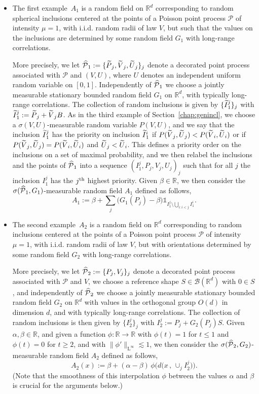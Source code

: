 \documentclass[AHL,Unicode,longabstracts]{cedram}
\newcommand{\R}{\mathbb R}
\newcommand{\B}{\mathcal B}
\newcommand{\Pc}{\mathcal P}
\DeclareMathOperator{\Ld}{L}
\let\oldtilde\tilde
\renewcommand*{\tilde}[1]{\mathchoice{\widetilde{#1}}{\widetilde{#1}}{\oldtilde{#1}}{\oldtilde{#1}}}\let\oldhat\hat
\renewcommand*{\hat}[1]{\mathchoice{\widehat{#1}}{\widehat{#1}}{\oldhat{#1}}{\oldhat{#1}}}\let\oldexists\exists
\renewcommand*{\exists}{\mathrel{\oldexists}}
\begin{document}
\begin{itemize}
\item The first example~$A_1$ is a random field on $\R^d$ corresponding to random spherical inclusions centered at the points of a Poisson point process $\Pc$ of intensity $\mu=1$, with i.i.d. random radii of law $V$, but such that the values on the inclusions are determined by some random field $G_1$ with long-range correlations.

More precisely, we let $\hat\Pc_1:=\{\tilde P_j,\tilde V_j,\tilde U_j\}_j$ denote a decorated point process associated with $\Pc$ and $(V,U)$, where $U$ denotes an independent uniform random variable on $[0,1]$. Independently of $\hat\Pc_1$ we choose a jointly measurable stationary bounded random field $G_1$ on $\R^d$, with typically long-range correlations. The collection of random inclusions is given by $\{\tilde I_1^j\}_j$ with $\tilde I_1^j:=\tilde P_j+\tilde V_jB$. As in the third example of Section~\ref{chap:genincl}, we choose a $\sigma(V,U)$-measurable random variable $P(V,U)$, and we say that the inclusion $\tilde I_1^j$ has the priority on inclusion $\tilde I_1^i$ if $P(\tilde V_j,\tilde U_j)<P(\tilde V_i,\tilde U_i)$ or if $P(\tilde V_j,\tilde U_j)=P(\tilde V_i,\tilde U_i)$ and $\tilde U_j<\tilde U_i$. This defines a priority order on the inclusions on a set of maximal probability, and we then relabel the inclusions and the points of $\hat\Pc_1$ into a sequence $(I_1^j, P_j,V_j,U_j)_j$ such that for all $j$ the inclusion $I_1^j$ has the $j^{\rm th}$ highest priority. Given $\beta\in\R$, we then consider the $\sigma(\hat\Pc_1,G_1)$-measurable random field $A_1$ defined as follows,
\[
A_1:=\beta+\sum_j\big(G_1(P_j)-\beta\big)\mathds1_{I_1^j\setminus\bigcup_{i:i<j}I_1^i}.
\]
\item The second example~$A_2$ is a random field on $\R^d$ corresponding to random inclusions centered at the points of a Poisson point process $\Pc$ of intensity $\mu=1$, with i.i.d. random radii of law $V$, but with orientations determined by some random field $G_2$ with long-range correlations.

More precisely, we let $\hat\Pc_2:=\{P_j,V_j\}_j$ denote a decorated point process associated with $\Pc$ and $V$, we choose a reference shape $S\in\B(\R^d)$ with $0\in S$, and independently of $\hat\Pc_2$ we choose a jointly measurable stationary bounded random field $G_2$ on $\R^d$ with values in the orthogonal group $O(d)$ in dimension $d$, and with typically long-range correlations. The collection of random inclusions is then given by $\{I_2^j\}_j$ with $I_2^j:=P_j+G_2(P_j) S$. Given $\alpha,\beta\in\R$, and given a function $\phi:\R\to\R$ with $\phi(t)=1$ for $t\le1$ and $\phi(t)=0$ for $t\ge2$, and with $\|\phi'\|_{\Ld^\infty}\lesssim1$, we then consider the $\sigma(\hat\Pc_2,G_2)$-measurable random field $A_2$ defined as follows,
\[
A_2(x):=\beta+(\alpha-\beta)\,\phi\Big(d\big(x\,,\,\cup_jI_2^j\big)\Big).
\]
(Note that the smoothness of this interpolation $\phi$ between the values $\alpha$ and $\beta$ is crucial for the arguments below.)


\end{itemize}
\end{document}
